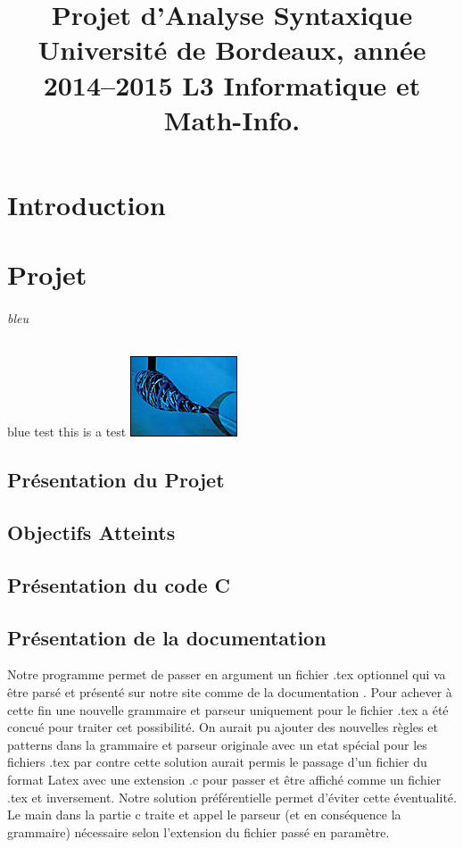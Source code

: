 \documentclass{report}
\title{Projet d’Analyse Syntaxique Université de Bordeaux, année 2014–2015 L3 Informatique et Math-Info.}
\begin{document}
\maketitle
\tableofcontents
\part{Introduction}
\part{Projet}
\paragraph{bleu}{\color{blue}blue test this is a test }
\includegraphics{pic.jpg}
\chapter{Présentation du Projet}
\chapter{Objectifs Atteints}
\chapter{Présentation du code C}
\chapter{Présentation de la documentation}
Notre programme permet de passer en argument un fichier .tex optionnel qui va être parsé et présenté sur notre site comme de la documentation .
Pour achever à cette fin une nouvelle grammaire et parseur uniquement pour le fichier .tex a été concué pour traiter cet possibilité. On aurait pu ajouter des nouvelles règles et patterns dans la grammaire et parseur originale avec un etat spécial pour les fichiers .tex par contre cette solution aurait permis le passage d'un fichier du format Latex avec une extension .c pour passer et être affiché comme un fichier .tex et inversement. Notre solution préférentielle permet d'éviter cette éventualité. Le main dans la partie c traite et appel le parseur (et en conséquence la grammaire) nécessaire selon l'extension du fichier passé en paramètre.
\end{document}
